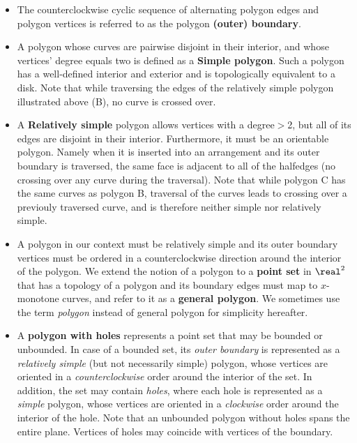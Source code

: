 \begin{itemize}

\item The counterclockwise cyclic sequence of alternating polygon edges and
polygon vertices is referred to as the polygon \textbf{(outer) boundary}.

\item A polygon whose curves are pairwise disjoint in their interior, and whose vertices' degree equals two is defined as a \textbf{Simple polygon}. Such a polygon has a well-defined interior and exterior and is topologically equivalent to a disk.  Note that while traversing the edges of the relatively simple polygon illustrated above (B), no curve is crossed over.

\item A \textbf{Relatively simple} polygon allows vertices with a degree$>$2, but all of its edges are disjoint in their interior. Furthermore, it must be an orientable polygon.  Namely when it is inserted into an arrangement and its outer boundary is traversed, the same face is adjacent to all of the halfedges (no crossing over any curve during the traversal).  
Note that while polygon C has the same curves as polygon B, traversal of the curves leads to crossing over a previouly traversed curve, and is therefore neither simple nor relatively simple.  

\item A polygon in our context must be relatively simple and its outer boundary vertices must be ordered in a counterclockwise direction around the interior of the polygon.
We extend the notion of a polygon to a \textbf{point set} in $\real^2$
that has  a topology of a polygon and its boundary edges must map to
$x$-monotone curves, and refer to it as a \textbf{general polygon}. We
sometimes use the term {\em polygon} instead of general polygon for
simplicity hereafter.

\item A \textbf{polygon with holes} represents a point set that may
be bounded or unbounded. In case of a bounded set, its {\em outer
boundary} is represented as a {\em relatively simple } (but not necessarily simple) polygon, whose vertices are oriented in a {\em counterclockwise }
order around the interior of the set. In addition, the set may contain
{\em holes}, where each hole is represented as a {\em simple}
polygon, whose vertices are oriented in a {\em clockwise} order around the
interior of the hole. Note that an unbounded polygon without holes
spans the entire plane. Vertices of holes may coincide with vertices
of the boundary.


\end{itemize}
